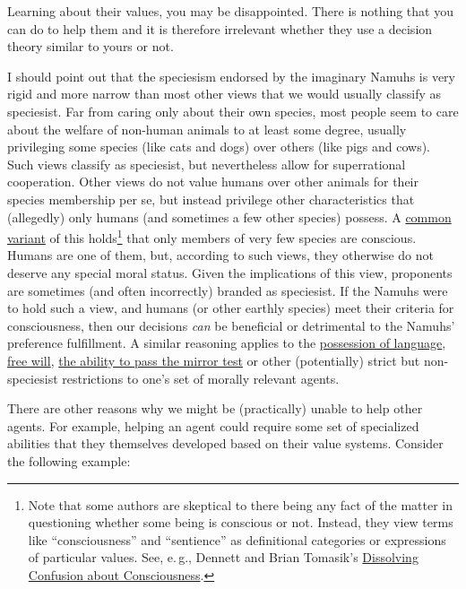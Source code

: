 Learning about their values, you may be disappointed. There is nothing
that you can do to help them and it is therefore irrelevant whether they
use a decision theory similar to yours or not.

I should point out that the speciesism endorsed by the imaginary Namuhs
is very rigid and more narrow than most other views that we would
usually classify as speciesist. Far from caring only about their own
species, most people seem to care about the welfare of non-human animals
to at least some degree, usually privileging some species (like
cats and dogs) over others (like pigs and cows). Such views classify as
speciesist, but nevertheless allow for superrational cooperation. Other
views do not value humans over other animals for their species
membership per se, but instead privilege other characteristics that
(allegedly) only humans (and sometimes a few other species) possess. A
\href{https://en.wikipedia.org/wiki/Animal_consciousness\#Philosophical_background}{common
variant} of this holds\footnote{Note that some authors are skeptical to
  there being any fact of the matter in questioning whether some being
  is conscious or not. Instead, they view terms like ``consciousness''
  and ``sentience'' as definitional categories or expressions of
  particular values. See, e.\,g., Dennett \citeyear{Dennett1991-es}
  and Brian Tomasik's
  \href{http://reducing-suffering.org/dissolving-confusion-about-consciousness/}{Dissolving
  Confusion about Consciousness}.} that only members of very few
species are conscious. Humans are one of them, but, according to such
views, they otherwise do not deserve any special moral status. Given the
implications of this view, proponents are sometimes (and often
incorrectly) branded as speciesist. If the Namuhs were to hold such a
view, and humans (or other earthly species) meet their criteria for
consciousness, then our decisions \emph{can} be beneficial or
detrimental to the Namuhs' preference fulfillment. A similar reasoning
applies to the
\href{https://en.wikipedia.org/wiki/Animal_consciousness\#Language}{possession
of language}, \href{https://en.wikipedia.org/wiki/Free_will}{free
will},
\href{https://en.wikipedia.org/wiki/Animal_consciousness\#Mirror_test}{the
ability to pass the mirror test} or other (potentially) strict but
non-speciesist restrictions to one's set of morally relevant agents.

There are other reasons why we might be (practically) unable to help
other agents. For example, helping an agent could require some set of
specialized abilities that they themselves developed based on their
value systems. Consider the following example:

